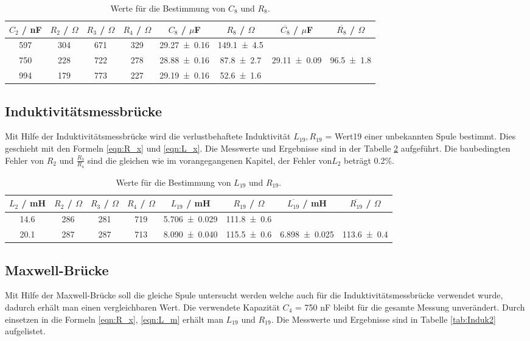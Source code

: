 \begin{table}[H] %
  \centering
  \begin{tabular}{c c c c c c c c}
    \toprule
    $C_2$ / nF & $R_2$ / $\Omega$ & $R_3$ / $\Omega$ & $R_4$ / $\Omega$ & $C_8$ / $\mu$F & $R_8$ / $\Omega$ & $\overline{C_8}$ / $\mu$F & $\overline{R_8}$ / $\Omega$ \\
    \midrule
    597 & 304 & 671 & 329 & \num{29.27 +- 0.16} & \num{149.1 +- 4.5} & & \\
    750 & 228 & 722 & 278 & \num{28.88 +- 0.16} & \num{87.8 +- 2.7} & \num{29.11 +- 0.09} & \num{96.5 +- 1.8} \\
    994 & 179 & 773 & 227 & \num{29.19 +- 0.16} & \num{52.6 +- 1.6} & & \\
  \end{tabular}
  \caption{Werte für die Bestimmung von $C_8$ und $R_8$.}
  \label{tab:Kapa3}
\end{table}

\newpage
\subsection{Induktivitätsmessbrücke}
\label{sec:Induk}
Mit Hilfe der Induktivitätsmessbrücke wird die verlustbehaftete Induktivität $L_{19}, R_{19}$ = Wert19 einer unbekannten Spule bestimmt. Dies geschieht mit den Formeln \ref{eqn:R_x} und \ref{eqn:L_x}. Die Messwerte und Ergebnisse sind in der Tabelle \ref{tab:Induk1} aufgeführt. Die baubedingten Fehler von $R_2$ und $\frac{R_3}{R_4}$ sind die gleichen wie im vorangegangenen Kapitel, der Fehler von$L_2$ beträgt 0.2\%.

\begin{table}[H] %
  \centering
  \begin{tabular}{c c c c c c c c}
    \toprule
    $L_2$ / mH & $R_2$ / $\Omega$ & $R_3$ / $\Omega$ & $R_4$ / $\Omega$ & $L_{19}$ / mH & $R_{19}$ / $\Omega$ & $\overline{L_{19}}$ / mH & $\overline{R_{19}}$ / $\Omega$ \\
    \midrule
    14.6 & 286 & 281 & 719 & \num{5.706 +- 0.029} & \num{111.8 +- 0.6} & & \\
    20.1 & 287 & 287 & 713 & \num{8.090 +- 0.040} & \num{115.5 +- 0.6} & \num{6.898 +- 0.025} & \num{113.6 +- 0.4} \\
  \end{tabular}
  \caption{Werte für die Bestimmung von $L_{19}$ und $R_{19}$.}
  \label{tab:Induk1}
\end{table}

\subsection{Maxwell-Brücke}
\label{sec:Maxwell}
Mit Hilfe der Maxwell-Brücke soll die gleiche Spule untersucht werden welche auch für die Induktivitätsmessbrücke verwendet wurde, dadurch erhält man einen vergleichbaren Wert. Die verwendete Kapazität $C_4$ = 750 nF bleibt für die gesamte Messung unverändert. Durch einsetzen in die Formeln \ref{eqn:R_x}, \ref{eqn:L_m} erhält man $L_{19}$ und $R_{19}$. Die Messwerte und Ergebnisse sind in Tabelle \ref{tab:Induk2} aufgelistet.

